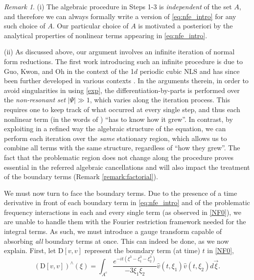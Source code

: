 \documentclass[a4paper,
11pt,  reqno]{amsart}
\newcommand{\5}{\textup{V}}
\newcommand{\noi}{\noindent}
\theoremstyle{remark}
\newtheorem{remark}[theorem]{Remark}
\numberwithin{equation}{section}
\numberwithin{theorem}{section}
\newcommand{\D}{\mathrm{D}}
\begin{document}
\begin{remark}
\rm 
(i) The algebraic procedure in Steps 1-3 is \textit{independent} of the set $A$, and therefore we can always formally write a version of \eqref{eq:nfe_intro} for any such choice of $A$. 
Our particular choice of $A$ is motivated a posteriori by the analytical properties of nonlinear terms appearing in \eqref{eq:nfe_intro}.


\smallskip


\noi(ii) As discussed above, our argument involves an infinite iteration of normal form reductions. The first work introducing such an infinite procedure is due to Guo, Kwon, and Oh \cite{GuoKwonOh_nls} in the context of the 1$d$ periodic cubic NLS and has since been further developed in various contexts \cite{CS20, kishimoto, Kishimoto_nls,KwonOh_uu_mkdv, KOY20}. 
In the arguments therein, in order to avoid singularities in using \eqref{exp}, the differentiation-by-parts is performed over the \emph{non-resonant set} $|\Psi|\gg 1$, which varies along the iteration process. This requires one to keep track of what occurred at every single step, and thus each nonlinear term (in the words of \cite{GuoKwonOh_nls}) ``has to know how it grew''. In contrast, by exploiting in a refined way the algebraic structure of the equation, we can perform each iteration over the \emph{same} stationary region, which allows us to combine all terms with the same structure, regardless of ``how they grew''. The fact that the problematic region does not change along the procedure proves essential in the referred algebraic cancellations and will also impact the treatment of the boundary terms (Remark \ref{remark:factorial}).  



\end{remark}


\medskip 



We must now turn to face the boundary terms. 
Due to the presence of a time derivative in front of each boundary term in \eqref{eq:nfe_intro} and of the problematic frequency interactions in each and every single term (as observed in \eqref{NF0}),  we are unable to handle them with the Fourier restriction framework needed for the integral terms. As such, we must introduce a gauge transform
    capable of absorbing \emph{all} boundary terms at once. This can indeed be done, as we now explain. First, let $\D[v,v]$ represent the  boundary term (at time) $t$ in \eqref{NF0},
\begin{equation}
	(\D[v,v])^\wedge(\xi) =  \int_{A^c}\frac{e^{-it (\xi^3 -
			\xi_1^3 - \xi_2^3) }}{-3\xi_1\xi_2}  \widehat{v}(t, \xi_1) \widehat{v}(t,\xi_2) d\vec{\xi}.\label{eq:D_intro}
\end{equation}
    
\end{document}
